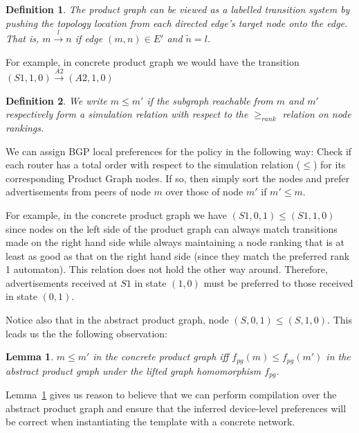 \documentclass{sig-alternate-10pt}
\newcommand{\KW}[1]{\texttt{\small\bfseries{#1}}}
\newtheorem{defn}{Definition}
\newtheorem{lem}[thm]{Lemma}
\begin{document}
\begin{defn}
The product graph can be viewed as a labelled transition system by pushing the topology location from each directed edge's target node onto the edge. That is, $m\overset{l}{\rightarrow}n$ if edge $(m,n) \in E'$ and $\tilde{n} = l$.
\end{defn}

For example, in concrete product graph we would have the transition $(S1,1,0)\overset{A2}{\rightarrow}(A2,1,0)$

\begin{defn}
We write $m \leq m'$ if the subgraph reachable from $m$ and $m'$ respectively form a simulation relation with respect to the $\geq_{rank}$ relation on node rankings.
\end{defn}

We can assign BGP local preferences for the policy in the following way: Check if each router has a total order with respect to the simulation relation ($\leq$) for its corresponding Product Graph nodes. If so, then simply sort the nodes and prefer advertisements from peers of node $m$ over those of node $m'$ if $m' \leq m$.

For example, in the concrete product graph we have $(S1,0,1) \leq (S1,1,0)$ since nodes on the left side of the product graph can always match transitions made on the right hand side while always maintaining a node ranking that is at least as good as that on the right hand side (since they match the preferred rank 1 automaton). This relation does not hold the other way around. Therefore, advertisements received at $S1$ in state $(1,0)$ must be preferred to those received in state $(0,1)$.

Notice also that in the abstract product graph, node $(S,0,1) \leq (S,1,0)$. This leads us the the following observation:

\begin{lem}
\label{lem:preference}
$m \leq m'$ in the concrete product graph iff $f_{pg}(m) \leq f_{pg}(m')$ in the abstract product graph under the lifted graph homomorphism $f_{pg}$.
\end{lem}

Lemma~\ref{lem:preference} gives us reason to believe that we can perform compilation over the abstract product graph and ensure that the inferred device-level preferences will be correct when instantiating the template with a concrete network.


\newcommand{\highlight}[1]{%
  \colorbox{red!50}{$\displaystyle#1$}}
\newcommand{\Router}[1]{\KW{Router} #1:}
\newcommand{\REGEX}[1]{\texttt{regex}(#1)}
\newcommand{\PEER}{\texttt{peer}}
\newcommand{\PREFIX}{\texttt{prefix}}
\newcommand{\IF}{\texttt{if}}
\newcommand{\THEN}{\texttt{then}}
\newcommand{\COMM}{\texttt{comm}}
\newcommand{\MED}{\texttt{MED}}
\newcommand{\Arrow}{\ensuremath{\leftarrow}}
\end{document}
